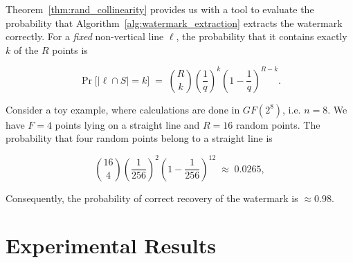 \documentclass[a4paper,11pt]{llncs}
\begin{document}
Theorem~\ref{thm:rand_collinearity} provides us with a tool to evaluate the probability that Algorithm~\ref{alg:watermark_extraction} extracts the watermark correctly. For a \emph{fixed} non-vertical line $\ell$, the probability that it contains exactly $k$ of the $R$ points is

\[
    \Pr\big[|\ell\cap S| = k\big] \;=\; \binom{R}{k}\left(\frac{1}{q}\right)^{k}\!\left(1-\frac{1}{q}\right)^{R-k}.
\]

\begin{example}
    Consider a toy example, where calculations are done in $GF(2^8)$, i.e. $n=8$. We have $F=4$ points lying on a straight line and $R=16$ random points. The probability that four random points belong to a straight line is
    
    \[
        \binom{16}{4}\left(\frac{1}{256}\right)^{2}\!\left(1-\frac{1}{256}\right)^{12}\;\approx\; 0.0265,
    \]
    
    Consequently, the probability of correct recovery of the watermark is $\approx 0.98$.
\end{example}

\section{Experimental Results}
\label{sec:experimental_results}
\end{document}
